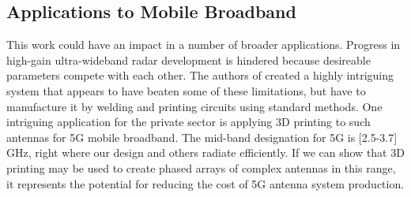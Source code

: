 \documentclass[../../../main.tex]{subfiles}
\begin{document}
\subsection{Applications to Mobile Broadband}
\label{sec:applications}

This work could have an impact in a number of broader applications.  Progress in high-gain ultra-wideband radar development is hindered because desireable parameters compete with each other.  The authors of \cite{10.3390/electronics10121377} created a highly intriguing system that appears to have beaten some of these limitations, but have to manufacture it by welding and printing circuits using standard methods.  One intriguing application for the private sector is applying 3D printing to such antennas for 5G mobile broadband.  The mid-band designation for 5G is [2.5-3.7] GHz, right where our design and others radiate efficiently.  If we can show that 3D printing may be used to create phased arrays of complex antennas in this range, it represents the potential for reducing the cost of 5G antenna system production.
\end{document}
